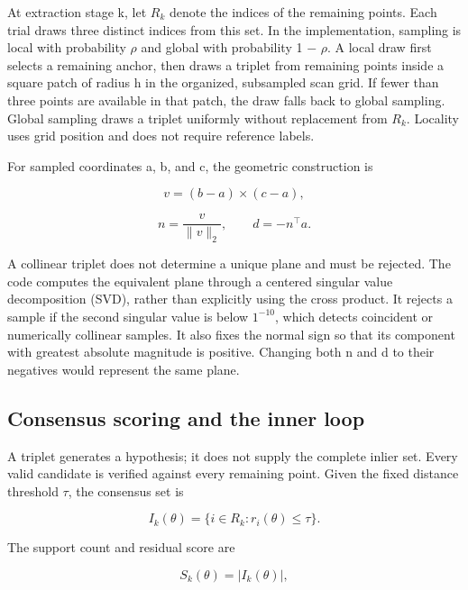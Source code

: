 At extraction stage k, let \(R_{k}\) denote the indices of the remaining points. Each trial draws three distinct indices from this set. In the implementation, sampling is local with probability \(\rho\) and global with probability 1 \(-\) \(\rho\). A local draw first selects a remaining anchor, then draws a triplet from remaining points inside a square patch of radius h in the organized, subsampled scan grid. If fewer than three points are available in that patch, the draw falls back to global sampling. Global sampling draws a triplet uniformly without replacement from \(R_{k}\). Locality uses grid position and does not require reference labels.

For sampled coordinates a, b, and c, the geometric construction is

\begin{equation}
v=(b-a)\times(c-a),
\label{eq:3}
\end{equation}

\begin{equation}
n=\frac{v}{\|v\|_2},\qquad d=-n^\top a.
\label{eq:4}
\end{equation}

A collinear triplet does not determine a unique plane and must be rejected. The code computes the equivalent plane through a centered singular value decomposition (SVD), rather than explicitly using the cross product. It rejects a sample if the second singular value is below \(1^{-10}\), which detects coincident or numerically collinear samples. It also fixes the normal sign so that its component with greatest absolute magnitude is positive. Changing both n and d to their negatives would represent the same plane.

\subsection{Consensus scoring and the inner loop}\label{consensus-scoring-and-the-inner-loop}

A triplet generates a hypothesis; it does not supply the complete inlier set. Every valid candidate is verified against every remaining point. Given the fixed distance threshold \(\tau\), the consensus set is

\begin{equation}
I_k(\theta)=\{i\in R_k:r_i(\theta)\leq\tau\}.
\label{eq:5}
\end{equation}

The support count and residual score are

\begin{equation}
S_k(\theta)=|I_k(\theta)|,
\label{eq:6}
\end{equation}


